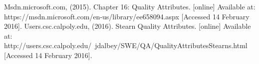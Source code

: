 	\begin{itemize}

		 Msdn.microsoft.com, (2015). Chapter 16: Quality Attributes.
				[online]  Available at: https://msdn.microsoft.com/en-us/library/ee658094.aspx [Accessed 14 February 2016].
		 Users.csc.calpoly.edu, (2016). Stearn Quality Attributes.
				[online]  Available at: http://users.csc.calpoly.edu/~jdalbey/SWE/QA/QualityAttributesStearns.html [Accessed 14 February 2016].

	\end{itemize}
